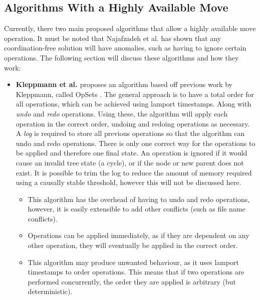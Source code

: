 \documentclass[12pt]{report}
\begin{document}
\subsection{Algorithms With a Highly Available Move} \label{sssec:algorithms}
Currently, there two main proposed algorithms that allow a highly available move operation. It must be noted that Najafzadeh et al. \cite{Najafzadeh0E18} has shown that any coordination-free solution will have anomalies, such as having to ignore certain operations. The following section will discuss these algorithms and how they work: \par
\begin{itemize}
    \item
          \textbf{Kleppmann et al. \cite{9563274}} proposes an algorithm based off previous work by Kleppmann, called OpSets \cite{https://doi.org/10.48550/arxiv.1805.04263}. The general approach is to have a total order for all operations, which can be achieved using lamport timestamps. Along with \textit{undo} and \textit{redo} operations. Using these, the algorithm will apply each operation in the correct order, undoing and redoing operations as necessary. A \textit{log} is required to store all previous operations so that the algorithm can undo and redo operations. There is only one correct way for the operations to be applied and therefore one final state. An operation is ignored if it would cause an invalid tree state (a cycle), or if the node or new parent does not exist. It is possible to trim the log to reduce the amount of memory required using a causally stable threshold, however this will not be discussed here. \par
          \begin{itemize}
            \item This algorithm has the overhead of having to undo and redo operations, however, it is easily extensible to add other conflicts (such as file name conflicts). \par
            \item Operations can be applied immediately, as if they are dependent on any other operation, they will eventually be applied in the correct order. \par
            \item This algorithm may produce unwanted behaviour, as it uses lamport timestamps to order operations. This means that if two operations are performed concurrently, the order they are applied is arbitrary (but deterministic). \par
          \end{itemize}


\end{itemize}
\end{document}
